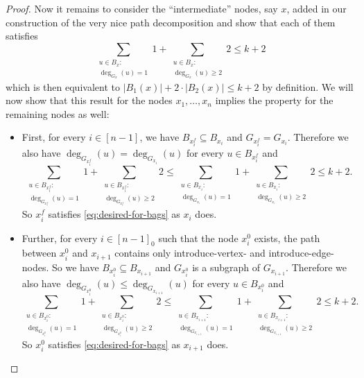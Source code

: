 \documentclass[a4paper,UKenglish,cleveref, autoref, thm-restate]{lipics-v2021}
\begin{document}
\begin{proof}
		Now it remains to consider the ``intermediate'' nodes, say $x$, added in our construction of the very nice path decomposition and show that each of them satisfies 
		\begin{equation}\label{eq:desired-for-bags}
			\sum_{\substack{u \in B_x \colon \\ \deg_{G_x}(u) = 1}} 1 + \sum_{\substack{u \in B_x \colon \\ \deg_{G_x}(u) \geq 2}} 2  \leq k + 2
		\end{equation}
		which is then equivalent to $|B_1(x)| + 2 \cdot |B_2(x)| \leq k + 2$ by definition.
		We will now show that this result for the nodes $x_1, \dots, x_n$ implies the property for the remaining nodes as well:
		\begin{itemize}
		\item First, for every $i \in [n-1]$, we have $B_{x_i^f} \subseteq B_{x_i}$ and $G_{x_i^f} = G_{x_i}$.
		Therefore we also have $\deg_{G_{x_i^f}}(u) = \deg_{G_{x_i}}(u)$ for every $u \in B_{x_i^f}$ and
		\[
			\sum_{\substack{u \in B_{x_i^f} \colon \\ \deg_{G_{x_i^f}}(u) = 1}} 1 + \sum_{\substack{u \in B_{x_i^f} \colon \\ \deg_{G_{x_i^f}}(u) \geq 2}} 2 \leq \sum_{\substack{u \in B_{x_i} \colon \\ \deg_{G_{x_i}}(u) = 1}} 1 + \sum_{\substack{u \in B_{x_i} \colon \\ \deg_{G_{x_i}}(u) \geq 2}} 2 \leq k+2.
		\]
		So $x_i^f$ satisfies \eqref{eq:desired-for-bags} as $x_i$ does.
		
		\item Further, for every $i \in [n-1]_0$ such that the node $x_i^0$ exists, the path between $x_i^0$ and $x_{i+1}$ contains only introduce-vertex- and introduce-edge-nodes.
		So we have $B_{x_i^0} \subseteq B_{x_{i+1}}$ and $G_{x_i^0}$ is a subgraph of $G_{x_{i+1}}$.
		Therefore we also have $\deg_{G_{x_i^0}}(u) \leq \deg_{G_{x_{i+1}}}(u)$ for every $u \in B_{x_i^0}$ and
		\[
			\sum_{\substack{u \in B_{x_i^0} \colon \\ \deg_{G_{x_i^0}}(u) = 1}} 1 + \sum_{\substack{u \in B_{x_i^0} \colon \\ \deg_{G_{x_i^0}}(u) \geq 2}} 2 \leq \sum_{\substack{u \in B_{x_{i+1}} \colon \\ \deg_{G_{x_{i+1}}}(u) = 1}} 1 + \sum_{\substack{u \in B_{x_{i+1}} \colon \\ \deg_{G_{x_{i+1}}}(u) \geq 2}} 2 \leq k+2.
		\]
		So $x_i^0$ satisfies \eqref{eq:desired-for-bags} as $x_{i+1}$ does.
		

\end{itemize}
\end{proof}
\end{document}
